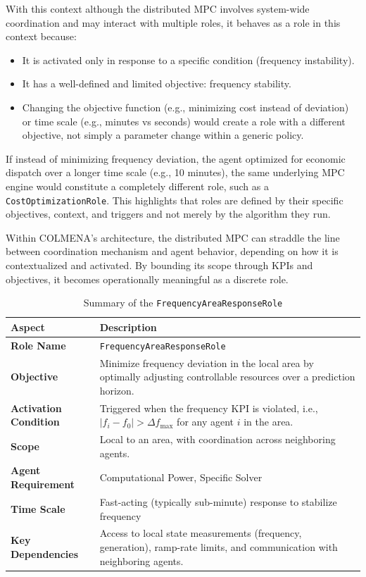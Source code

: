 \documentclass{article}
\begin{document}
With this context although the distributed MPC involves system-wide coordination and may interact with multiple roles, it behaves as a role in this context because:
\begin{itemize}
    \item It is activated only in response to a specific condition (frequency instability).
    \item It has a well-defined and limited objective: frequency stability.
    \item Changing the objective function (e.g., minimizing cost instead of deviation) or time scale (e.g., minutes vs seconds) would create a role with a different objective, not simply a parameter change within a generic policy.
\end{itemize}

If instead of minimizing frequency deviation, the agent optimized for economic dispatch over a longer time scale (e.g., 10 minutes), the same underlying MPC engine would constitute a completely different role, such as a \texttt{CostOptimizationRole}. This highlights that roles are defined by their specific objectives, context, and triggers and not merely by the algorithm they run.

Within COLMENA’s architecture, the distributed MPC can straddle the line between coordination mechanism and agent behavior, depending on how it is contextualized and activated. By bounding its scope through KPIs and objectives, it becomes operationally meaningful as a discrete role.

\begin{table}[h!]
\centering
\begin{tabular}{|p{4cm}|p{10cm}|}
\hline
\textbf{Aspect} & \textbf{Description} \\
\hline
\textbf{Role Name} & \texttt{FrequencyAreaResponseRole} \\
\hline
\textbf{Objective} & Minimize frequency deviation in the local area by optimally adjusting controllable resources over a prediction horizon. \\
\hline
\textbf{Activation Condition} & Triggered when the frequency KPI is violated, i.e., $|f_i - f_0| > \Delta f_{\text{max}}$ for any agent $i$ in the area. \\
\hline
\textbf{Scope} & Local to an area, with coordination across neighboring agents. \\
\hline
\textbf{Agent Requirement} & Computational Power, Specific Solver\\
\hline
\textbf{Time Scale} & Fast-acting (typically sub-minute) response to stabilize frequency\\
\hline
\textbf{Key Dependencies} & Access to local state measurements (frequency, generation), ramp-rate limits, and communication with neighboring agents. \\
\hline
\end{tabular}
\caption{Summary of the \texttt{FrequencyAreaResponseRole}}
\end{table}
\end{document}

